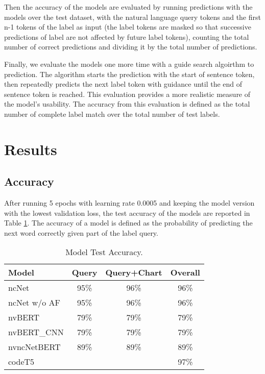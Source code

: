 \documentclass[
	a4paper, %
	10pt, %
	unnumberedsections, %
	twoside, %
]{t0003}
\begin{document}
Then the accuracy of the models are evaluated by running predictions with the models over the test dataset, with the natural language query tokens and the first n-1 tokens of the label as input (the label tokens are masked so that successive predictions of label are not affected by future label tokens), counting the total number of correct predictions and dividing it by the total number of predictions.

Finally, we evaluate the models one more time with a guide search algoirthm to prediction. The algorithm starts the prediction with the start of sentence token, then repeatedly predicts the next label token with guidance until the end of sentence token is reached. This evaluation provides a more realistic measure of the model's usability. The accuracy from this evaluation is defined as the total number of complete label match over the total number of test labels.

\section{Results}

\subsection{Accuracy}

After running 5 epochs with learning rate 0.0005 and keeping the model version with the lowest validation loss, the test accuracy of the models are reported in Table \ref{tab:accuracy}. The accuracy of a model is defined as the probability of predicting the next word correctly given part of the label query.

\begin{table} %
	\caption{Model Test Accuracy.}
	\centering
	\begin{tabular}{lccc}
		\toprule
		Model & Query & Query+Chart & Overall  \\
		\midrule
		ncNet & 95\% & 96\% & 96\% \\
		ncNet w/o AF & 95\% & 96\% & 96\%  \\
		\hline
		nvBERT & 79\% & 79\% & 79\% \\
		nvBERT\_CNN &  79\% & 79\% & 79\% \\
		\hline
		nvncNetBERT & 89\% & 89\% & 89\% \\
		\hline
		codeT5 & & & 97\% \\
		\bottomrule
	\end{tabular}
	\label{tab:accuracy}
\end{table}
\end{document}
